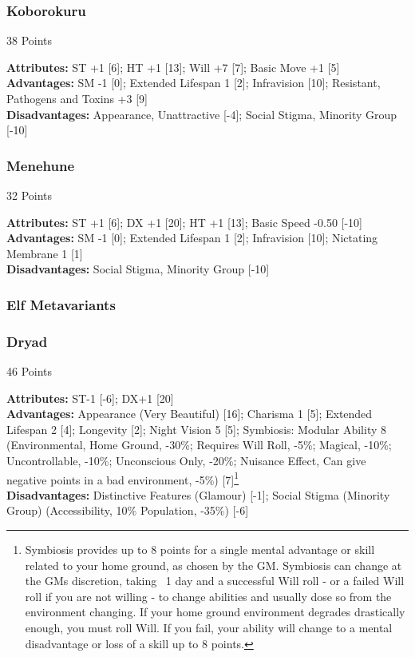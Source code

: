 \begin{multicols*}{3}
	\subsubsection*{Koborokuru}
	\begin{flushright}
		38 Points
	\end{flushright}
	\textbf{Attributes:}
	ST +1 [6]; HT +1 [13]; Will +7 [7]; Basic Move +1 [5]
	\\\textbf{Advantages:}
	SM -1 [0]; Extended Lifespan 1 [2]; Infravision [10]; Resistant, Pathogens and Toxins +3 [9]
	\\\textbf{Disadvantages:} 
	Appearance, Unattractive [-4]; Social Stigma, Minority Group [-10]
	
	\subsubsection*{Menehune}
	\begin{flushright}
		32 Points
	\end{flushright}
	\textbf{Attributes:}
	ST +1 [6]; DX +1 [20]; HT +1 [13]; Basic Speed -0.50 [-10]
	\\\textbf{Advantages:}
	SM -1 [0]; Extended Lifespan 1 [2]; Infravision [10]; Nictating Membrane 1 [1]
	\\\textbf{Disadvantages:} 
	Social Stigma, Minority Group [-10]
	
	\subsubsection{Elf Metavariants}
	
	\subsubsection*{Dryad}
	\begin{flushright}
		46 Points
	\end{flushright}
	\textbf{Attributes:} 
	ST-1 [-6]; DX+1 [20]
	\\\textbf{Advantages:} 
	Appearance (Very Beautiful) [16]; Charisma 1 [5]; Extended Lifespan 2 [4]; Longevity [2]; Night Vision 5 [5]; Symbiosis: Modular Ability 8 (Environmental, Home Ground, -30\%; Requires Will Roll, -5\%; Magical, -10\%; Uncontrollable, -10\%; Unconscious Only, -20\%; Nuisance Effect, Can give negative points in a bad environment, -5\%) [7]\footnote{Symbiosis provides up to 8 points for a single mental advantage or skill related to your home ground, as chosen by the GM. Symbiosis can change at the GMs discretion, taking ~1 day and a successful Will roll - or a failed Will roll if you are not willing - to change abilities and usually dose so from the environment changing. If your home ground environment degrades drastically enough, you must roll Will. If you fail, your ability will change to a mental disadvantage or loss of a skill up to 8 points.}
	\\\textbf{Disadvantages:} 
	Distinctive Features (Glamour) [-1]; Social Stigma (Minority Group) (Accessibility, 10\% Population, -35\%) [-6]
	

\end{multicols*}

